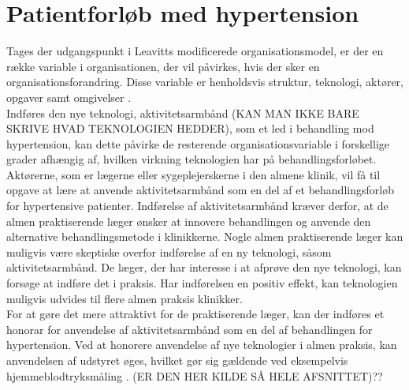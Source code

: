 \section{Patientforløb med hypertension}
Tages der udgangspunkt i Leavitts modificerede organisationsmodel, er der en række variable i organisationen, der vil påvirkes, hvis der sker en organisationsforandring. Disse variable er henholdsvis struktur, teknologi, aktører, opgaver samt omgivelser \citep{mtvhaandbog}. \\
Indføres den nye teknologi, aktivitetsarmbånd (KAN MAN IKKE BARE SKRIVE HVAD TEKNOLOGIEN HEDDER), som et led i behandling mod hypertension, kan dette påvirke de resterende organisationsvariable i forskellige grader afhængig af, hvilken virkning teknologien har på behandlingsforløbet. \\
Aktørerne, som er lægerne eller sygeplejerskerne i den almene klinik, vil få til opgave at lære at anvende aktivitetsarmbånd som en del af et behandlingsforløb for hypertensive patienter. Indførelse af aktivitetsarmbånd kræver derfor, at de almen praktiserende læger ønsker at innovere behandlingen og anvende den alternative behandlingsmetode i klinikkerne. Nogle almen praktiserende læger kan muligvis være skeptiske overfor indførelse af en ny teknologi, såsom aktivitetsarmbånd. De læger, der har interesse i at afprøve den nye teknologi, kan forsøge at indføre det i praksis. Har indførelsen en positiv effekt, kan teknologien muligvis udvides til flere almen praksis klinikker. \\
For at gøre det mere attraktivt for de praktiserende læger, kan der indføres et honorar for anvendelse af aktivitetsarmbånd som en del af behandlingen for hypertension. Ved at honorere anvendelse af nye teknologier i almen praksis, kan anvendelsen af udstyret øges, hvilket gør sig gældende ved eksempelvis hjemmeblodtryksmåling \citep{bang2006}. (ER DEN HER KILDE SÅ HELE AFSNITTET)?? 

